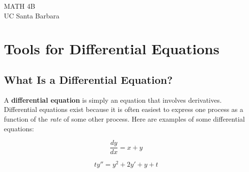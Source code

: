 

\maketitle

\begin{center}
	MATH 4B \\
	UC Santa Barbara
\end{center}
%
%
\tableofcontents

\pagebreak

\section{Tools for Differential Equations}
\subsection{What Is a Differential Equation?}
A \textbf{differential equation} is simply an equation that involves derivatives. Differential equations exist because it is often easiest to express one process as a function of the \textit{rate} of some other process. Here are examples of some differential equations:
\begin{center}
	\begin{minipage}{0.5\textwidth}
		$$\frac{dy}{dx} = x + y$$
	\end{minipage}%
	\begin{minipage}{0.5\textwidth}
		$$ty'' = y^{2} + 2y' + y + t$$
	\end{minipage}
\end{center}

